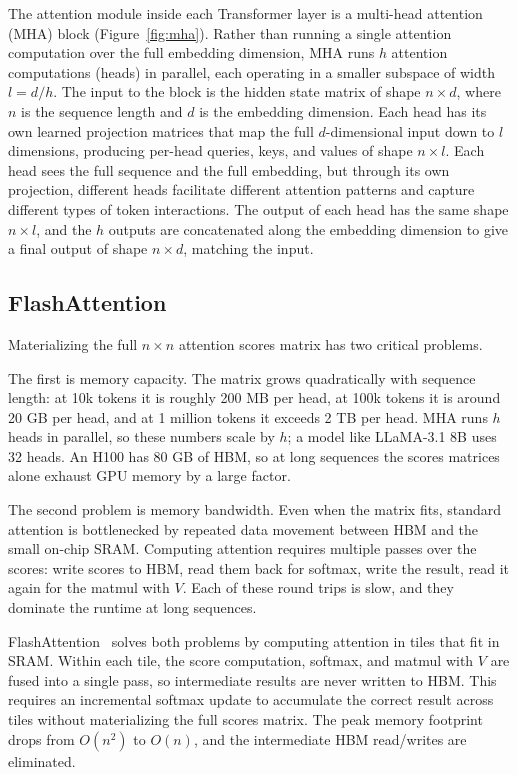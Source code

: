 The attention module inside each Transformer layer is a multi-head attention (MHA) block (Figure~\ref{fig:mha}).
Rather than running a single attention computation over the full embedding dimension, MHA runs $h$ attention computations (heads) in parallel, each operating in a smaller subspace of width $l = d / h$.
The input to the block is the hidden state matrix of shape $n \times d$, where $n$ is the sequence length and $d$ is the embedding dimension.
Each head has its own learned projection matrices that map the full $d$-dimensional input down to $l$ dimensions, producing per-head queries, keys, and values of shape $n \times l$.
Each head sees the full sequence and the full embedding, but through its own projection, different heads facilitate different attention patterns and capture different types of token interactions.
The output of each head has the same shape $n \times l$, and the $h$ outputs are concatenated along the embedding dimension to give a final output of shape $n \times d$, matching the input.


\subsection{FlashAttention}

Materializing the full $n \times n$ attention scores matrix has two critical problems.

The first is memory capacity. The matrix grows quadratically with sequence length: at 10k tokens it is roughly 200 MB per head, at 100k tokens it is around 20 GB per head, and at 1 million tokens it exceeds 2 TB per head. MHA runs $h$ heads in parallel, so these numbers scale by $h$; a model like LLaMA-3.1 8B uses 32 heads. An H100 has 80 GB of HBM, so at long sequences the scores matrices alone exhaust GPU memory by a large factor.

The second problem is memory bandwidth. Even when the matrix fits, standard attention is bottlenecked by repeated data movement between HBM and the small on-chip SRAM. Computing attention requires multiple passes over the scores: write scores to HBM, read them back for softmax, write the result, read it again for the matmul with $V$. Each of these round trips is slow, and they dominate the runtime at long sequences.

FlashAttention~\cite{dao2022flashattention} solves both problems by computing attention in tiles that fit in SRAM. Within each tile, the score computation, softmax, and matmul with $V$ are fused into a single pass, so intermediate results are never written to HBM. This requires an incremental softmax update to accumulate the correct result across tiles without materializing the full scores matrix. The peak memory footprint drops from $O(n^2)$ to $O(n)$, and the intermediate HBM read/writes are eliminated.

